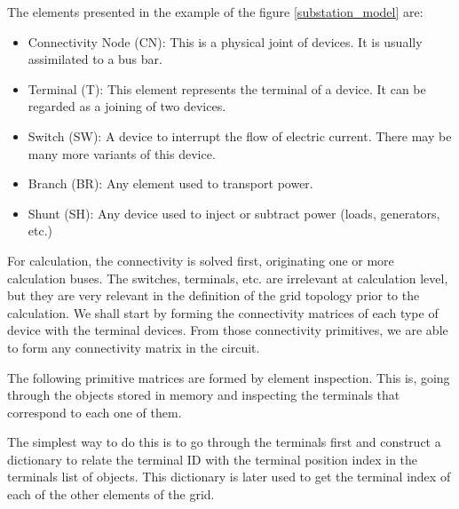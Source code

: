 \documentclass[nols,a4paper,twoside,notoc,fleqn]{tufte-book}
\begin{document}
The elements presented in the example of the figure \ref{substation_model} are:

\begin{itemize}
	\item Connectivity Node (CN): This is a physical joint of devices. It is usually assimilated to a bus bar.
	\item Terminal (T): This element represents the terminal of a device. It can be regarded as a joining of two devices.
	\item Switch (SW): A device to interrupt the flow of electric current. There may be many more variants of this device.
	\item Branch (BR): Any element used to transport power.
	\item Shunt (SH): Any device used to inject or subtract power (loads, generators, etc.)
\end{itemize}

For calculation, the connectivity is solved first, originating one or more calculation buses. The switches, terminals, etc. are irrelevant at calculation level, but they are very relevant in the definition of the grid topology prior to the calculation. We shall start by forming the connectivity matrices of each type of device with the terminal devices. From those connectivity primitives, we are able to form any connectivity matrix in the circuit. 

The following primitive matrices are formed by element inspection. This is, going through the objects stored in memory and inspecting the terminals that correspond to each one of them.

The simplest way to do this is to go through the terminals first and construct a dictionary to relate the terminal ID with the terminal position index in the terminals list of objects. This dictionary is later used to get the terminal index of each of the other elements of the grid.
\end{document}
